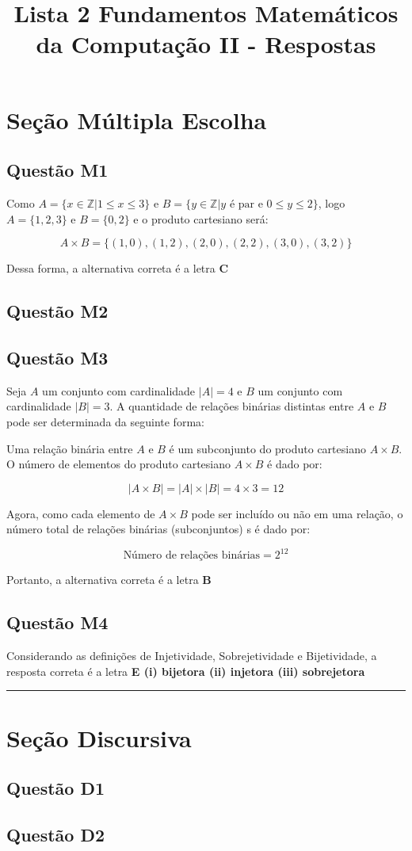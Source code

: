 \documentclass{article}
\title{Lista 2 Fundamentos Matemáticos da Computação II - Respostas}
\begin{document}
\maketitle

\section{Seção Múltipla Escolha}

\subsection{Questão M1} 
Como $A = \{x \in \mathbb{Z} | 1 \leq x \leq 3\}$ e $B = \{y \in \mathbb{Z} | y \text{ é par e } 0 \leq y \leq 2\}$, logo $A = \{1,2,3\}$ e $B = \{0,2\}$ e o produto cartesiano será:

\[
    A \times B = \{(1,0),(1,2),(2,0),(2,2),(3,0),(3,2)\}
\]

Dessa forma, a alternativa correta é a letra \textbf{C}


\subsection{Questão M2}
\subsection{Questão M3}
Seja \( A \) um conjunto com cardinalidade \( |A| = 4 \) e \( B \) um conjunto com cardinalidade \( |B| = 3 \). A quantidade de relações binárias distintas entre \( A \) e \( B \) pode ser determinada da seguinte forma:

Uma relação binária entre \( A \) e \( B \) é um subconjunto do produto cartesiano \( A \times B \). O número de elementos do produto cartesiano \( A \times B \) é dado por:

\[
|A \times B| = |A| \times |B| = 4 \times 3 = 12
\]

Agora, como cada elemento de \( A \times B \) pode ser incluído ou não em uma relação, o número total de relações binárias (subconjuntos) s é dado por:

\[
\text{Número de relações binárias} = 2^{12}
\]

Portanto, a alternativa correta é a letra \textbf{B}
\subsection{Questão M4}

Considerando as definições de Injetividade, Sobrejetividade e Bijetividade, a resposta correta é a letra \textbf{E (i) bijetora (ii) injetora (iii) sobrejetora}


\vspace{0.5em}
\hrule
\vspace{0.5em}

\section{Seção Discursiva}

\subsection{Questão D1}
\subsection{Questão D2}
\end{document}
